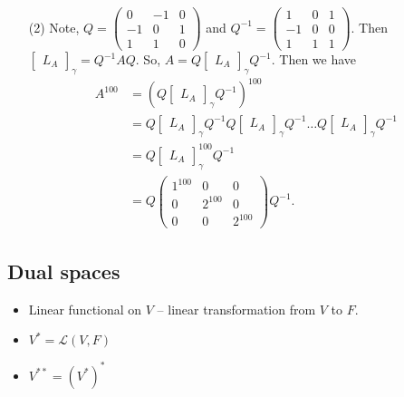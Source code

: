 \documentclass[12pt]{article}
\begin{document}
\begin{itemize}
    \item[(2)] Note, $Q = \begin{pmatrix}
    0 & -1 & 0 \\ -1 & 0 & 1 \\ 1 & 1 & 0
    \end{pmatrix}$ and $Q^{-1} = \begin{pmatrix}
    1 & 0 & 1 \\ -1 & 0 & 0 \\ 1 & 1 & 1
    \end{pmatrix}$. Then $\begin{bmatrix}
    L_A
    \end{bmatrix}_\gamma = Q^{-1}AQ$. So, $A = Q \begin{bmatrix}
    L_A
    \end{bmatrix}_\gamma Q^{-1}$. Then we have \begin{align*}
        A^{100} &= \left( Q \begin{bmatrix}
    L_A
    \end{bmatrix}_\gamma Q^{-1} \right)^{100} \\
    &= Q \begin{bmatrix}
    L_A
    \end{bmatrix}_\gamma Q^{-1} Q \begin{bmatrix}
    L_A
    \end{bmatrix}_\gamma Q^{-1} \dots Q \begin{bmatrix}
    L_A
    \end{bmatrix}_\gamma Q^{-1} \\
    &= Q \begin{bmatrix}
    L_A
    \end{bmatrix}_\gamma^{100} Q^{-1} \\
    &= Q \begin{pmatrix}
    1^{100} & 0 & 0 \\ 0 & 2^{100} & 0 \\ 0 & 0 & 2^{100}
    \end{pmatrix} Q^{-1}.
    \end{align*}
\end{itemize}

\subsection{Dual spaces}

\begin{itemize}
    \item Linear functional on $V$  --  linear transformation from $V$ to $F$.
    
    \item $V^* = \mathcal{L}(V,F)$
    
    \item $V^{**} = (V^*)^*$
\end{itemize}
\end{document}
